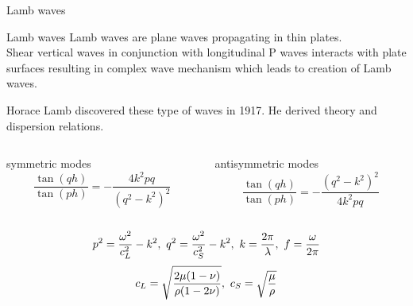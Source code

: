\documentclass[10pt,aspectratio=169,dvipsnames]{beamer} %
\begin{document}
	\begin{frame}{Lamb waves}
		\begin{alertblock}{Lamb waves}	
			Lamb waves are plane waves propagating in thin plates.\\
			Shear vertical waves in conjunction with longitudinal P waves interacts with plate surfaces resulting in complex wave mechanism which leads to creation of Lamb waves.
		\end{alertblock}
		Horace Lamb discovered these type of waves in 1917.
		He derived theory and dispersion relations.
		\begin{columns}[T]
			\begin{column}{0.5\textwidth}
				\centering
				symmetric modes
				\begin{equation*}
					\frac{\tan(q h)}{\tan(p h)} = -\frac{4 k^2 p q}{\left(q^2 - k^2\right)^2}
				\end{equation*}
			\end{column}
			\begin{column}{0.5\textwidth}
				\centering
				antisymmetric modes
				\begin{equation*}
					\frac{\tan(q h)}{\tan(p h)} = -\frac{\left(q^2 - k^2\right)^2}{4 k^2 p q}
				\end{equation*}
			\end{column}	
		\end{columns}	
		\centering
		\begin{gather*}
			\centering
			p^2 = \frac{\omega^2}{c_{L}^2}-k^2,\ q^2 = \frac{\omega^2}{c_{S}^2}-k^2,\ k = \frac{2\pi}{\lambda},\ f=\frac{\omega}{2\pi}
		\end{gather*}
		\newline
		\begin{gather*}
			\centering
			c_L=\sqrt{\frac{2\mu (1-\nu)}{\rho(1-2\nu)}},\ c_S=\sqrt{\frac{\mu}{\rho}}
		\end{gather*}
	\end{frame}
\end{document}
